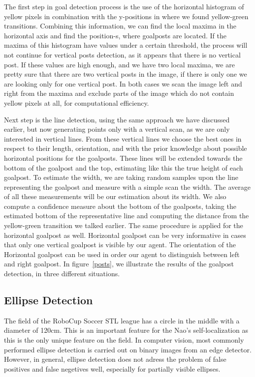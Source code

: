 \documentclass[	DIV=calc,%
							paper=a4,%
							fontsize=9pt,%
							twocolumn]{scrartcl}	 					%
\begin{document}
The first step in goal detection process is the use of the horizontal histogram of yellow pixels in combination with the y-positions in where we found yellow-green transitions. Combining this information, we can find the local maxima in the horizontal axis and find the position-s, where goalposts are located. If the maxima of this histogram have values under a certain threshold, the process will not continue for vertical posts detection, as it appears that there is no vertical post. If these values are high enough, and we have two local maxima, we are pretty sure that there are two vertical posts in the image, if there is only one we are looking only for one vertical post. In both cases we scan the image left and right from the maxima and exclude parts of the image which do not contain yellow pixels at all, for computational efficiency.

Next step is the line detection, using the same approach we have discussed earlier, but now generating points only with a vertical scan, as we are only interested in vertical lines. From these vertical lines we choose the best ones in respect to their length, orientation, and with the prior knowledge about possible horizontal positions for the goalposts. These lines will be extended towards the bottom of the goalpost and the top, estimating like this the true height of each goalpost. To estimate the width, we are taking random samples upon the line representing the goalpost and measure with a simple scan the width. The average of all these measurements will be our estimation about its width. We also compute a confidence measure about the bottom of the goalposts, taking the estimated bottom of the representative line and computing the distance from the yellow-green transition we talked earlier. The same procedure is applied for the horizontal goalpost as well. Horizontal goalpost can be very informative in cases that only one vertical goalpost is visible by our agent. The orientation of the Horizontal goalpost can be used in order our agent to distinguish between left and right goalpost. In figure~\ref{posts}, we illustrate the results of the goalpost detection, in three different situations.

\subsection{Ellipse Detection}
The field of the RoboCup Soccer STL league has a circle in the middle with a diameter of 120cm. This is an important feature for the Nao's self-localization as this is the only unique feature on the field. In computer vision, most commonly performed ellipse detection is carried out on binary images from an edge detector. However, in general, ellipse detection does not adress the problem of false positives and false negetives well, especially for partially visible ellipses.
\end{document}

